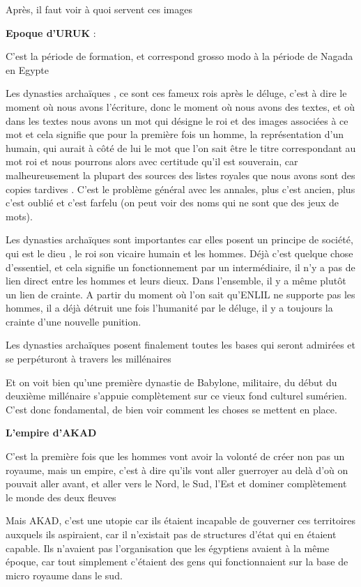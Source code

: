 \documentclass[a4paper,10pt]{article}
\begin{document}
Après, il faut voir à quoi servent ces images

\textbf{Epoque d'URUK} : 

C'est la période de formation, et correspond grosso
modo à la période de Nagada en Egypte

Les dynasties archaïques , ce sont ces fameux rois après le déluge,
c'est à dire le moment où nous avons
l'écriture, donc le moment où nous avons des textes,
et où dans les textes nous avons un mot qui désigne le roi et des
images associées à ce mot et cela signifie que pour la première fois un
homme, la représentation d'un humain, qui aurait à
côté de lui le mot que l'on sait être le titre
correspondant au mot roi et nous  pourrons alors avec certitude
qu'il est souverain, car malheureusement la plupart
des sources des listes royales que nous avons sont des copies tardives
. C'est le problème général avec les annales, plus
c'est ancien, plus c'est oublié et
c'est farfelu (on peut voir des noms qui ne sont que
des jeux de mots).

Les dynasties archaïques sont importantes car elles posent un principe
de société, qui est le dieu , le roi son vicaire humain et les hommes.
Déjà c'est quelque chose d'essentiel,
et cela signifie un fonctionnement par un intermédiaire, il
n'y a pas de lien direct entre les hommes et leurs
dieux.  Dans l'ensemble, il y a même plutôt un lien de
crainte. A partir du moment où  l'on sait
qu'ENLIL ne supporte pas les hommes, il a déjà détruit
une fois l'humanité par le déluge, il y a toujours la
crainte d'une nouvelle punition.

Les dynasties archaïques posent finalement toutes les bases qui seront
admirées et se perpéturont à travers les millénaires

Et on voit bien qu'une première dynastie de Babylone,
militaire, du début du deuxième millénaire s'appuie
complètement sur ce vieux fond culturel sumérien.
C'est donc fondamental, de bien voir comment les
choses se mettent en place.

\textbf{L'empire d'AKAD }

C'est  la première fois que les hommes vont avoir la
volonté de créer non pas un royaume, mais un empire,
c'est à dire qu'ils vont aller
guerroyer au delà d'où on pouvait aller avant, et
aller vers le Nord, le Sud, l'Est et dominer
complètement le  monde des deux fleuves

Mais AKAD, c'est une utopie car ils étaient incapable
de gouverner ces territoires auxquels ils aspiraient, car il
n'existait pas de structures d'état
qui en étaient capable. Ils n'avaient pas
l'organisation que les égyptiens avaient à la même
époque, car tout simplement c'étaient des gens qui
fonctionnaient sur la base de micro royaume dans le sud.
\end{document}
